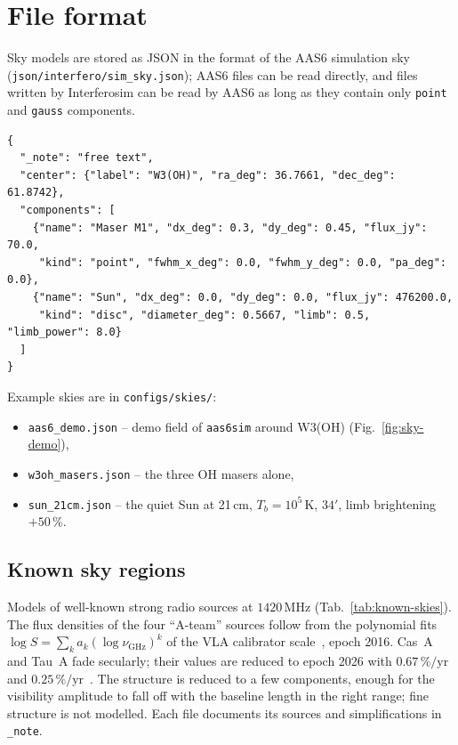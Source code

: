 \section{File format}

Sky models are stored as JSON in the format of the AAS6 simulation sky
(\texttt{\nolinkurl{json/interfero/sim_sky.json}}); AAS6 files can be read directly,
and files written by Interferosim can be read by AAS6 as long as they
contain only \texttt{point} and \texttt{gauss} components.

\begin{lstlisting}[basicstyle=\ttfamily\footnotesize, frame=single]
{
  "_note": "free text",
  "center": {"label": "W3(OH)", "ra_deg": 36.7661, "dec_deg": 61.8742},
  "components": [
    {"name": "Maser M1", "dx_deg": 0.3, "dy_deg": 0.45, "flux_jy": 70.0,
     "kind": "point", "fwhm_x_deg": 0.0, "fwhm_y_deg": 0.0, "pa_deg": 0.0},
    {"name": "Sun", "dx_deg": 0.0, "dy_deg": 0.0, "flux_jy": 476200.0,
     "kind": "disc", "diameter_deg": 0.5667, "limb": 0.5, "limb_power": 8.0}
  ]
}
\end{lstlisting}

Example skies are in \texttt{configs/skies/}:
\begin{itemize}
  \item \texttt{aas6\_demo.json} -- demo field of \texttt{aas6sim}
        around W3(OH) (Fig.~\ref{fig:sky-demo}),
  \item \texttt{w3oh\_masers.json} -- the three OH masers alone,
  \item \texttt{sun\_21cm.json} -- the quiet Sun at 21\,cm,
        $T_b = 10^5\,\mathrm{K}$, $34'$, limb brightening $+50\,\%$.
\end{itemize}

\subsection{Known sky regions}
Models of well-known strong radio sources at $1420\,\mathrm{MHz}$
(Tab.~\ref{tab:known-skies}). The flux densities of the four ``A-team''
sources follow from the polynomial fits
$\log S = \sum_k a_k (\log \nu_{\mathrm{GHz}})^k$ of the VLA calibrator
scale~\cite{perley2017}, epoch 2016. Cas~A and Tau~A fade secularly; their
values are reduced to epoch 2026 with $0.67\,\%/\mathrm{yr}$~\cite{trotter2017}
and $0.25\,\%/\mathrm{yr}$~\cite{perley2017}. The structure is reduced to a
few components, enough for the visibility amplitude to fall off with the
baseline length in the right range; fine structure is not modelled. Each
file documents its sources and simplifications in \texttt{\_note}.

